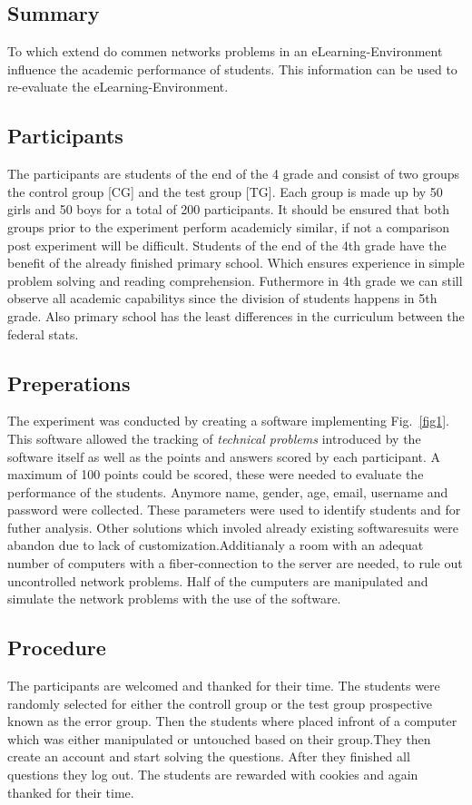 \documentclass[runningheads]{llncs}
\begin{document}
\subsection{Summary}
To which extend do commen networks problems in an eLearning-Environment
influence the academic performance of students. This information can be used to
re-evaluate the eLearning-Environment. 

\subsection{Participants}
The participants are students of the end of the 4 grade and consist of two groups the control group [CG] and
the test group [TG]. Each group is made up by 50 girls and 50 boys for a total of 200 participants.
It should be ensured that both groups prior to the experiment perform academicly similar, if not a
comparison post experiment will be difficult. Students of the end of the 4th grade have the benefit of the
already finished primary school. Which ensures experience in simple problem solving and
reading comprehension. Futhermore in 4th grade we can still observe all academic capabilitys
since the division of students happens in 5th grade. Also primary school has the least differences
in the curriculum between the federal stats.


\subsection{Preperations}
The experiment was conducted by creating a software implementing Fig.~\ref{fig1}.
This software\cite{ref_soft} allowed the tracking of {\itshape technical problems} introduced by
the software itself as well as the points and answers scored by each participant.
A maximum of 100 points could be scored, these were needed to evaluate the performance of
the students. Anymore name, gender, age, email, username and password were collected.
These parameters were used to identify students and for futher analysis.
Other solutions which involed already existing softwaresuits were abandon due to lack
of customization.Additianaly a room with an adequat number of computers with a fiber-connection
to the server are needed, to rule out uncontrolled network problems.
Half of the cumputers are manipulated and simulate the network problems with the
use of the software.

\subsection{Procedure}
The participants are welcomed and thanked for their time.
The students were randomly selected for either the controll group or the test group
prospective known as the error group. Then the students where placed infront of a computer
which was either manipulated or untouched based on their group.They then create an account
and start solving the questions.
After they finished all questions they log out.
The students are rewarded with cookies and again thanked for their time.
\end{document}
